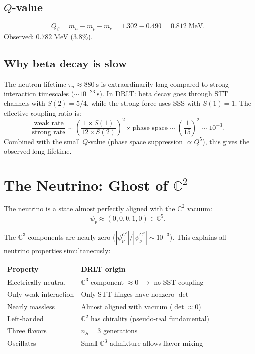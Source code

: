 \documentclass[12pt]{article}
\theoremstyle{remark}
\begin{document}
\subsection{$Q$-value}

\begin{equation}
Q_\beta = m_n - m_p - m_e = 1.302 - 0.490 = 0.812\;\text{MeV}.
\end{equation}
Observed: $0.782\;\text{MeV}$ (3.8\%).

\subsection{Why beta decay is slow}

The neutron lifetime $\tau_n \approx 880\;\text{s}$ is extraordinarily long compared to strong interaction timescales ($\sim 10^{-23}\;\text{s}$). In DRLT: beta decay goes through STT channels with $S(2) = 5/4$, while the strong force uses SSS with $S(1) = 1$. The effective coupling ratio is:
\begin{equation}
\frac{\text{weak rate}}{\text{strong rate}} \sim \left(\frac{1 \times S(1)}{12 \times S(2)}\right)^2 \times \text{phase space} \sim \left(\frac{1}{15}\right)^2 \sim 10^{-3}.
\end{equation}
Combined with the small $Q$-value (phase space suppression $\propto Q^5$), this gives the observed long lifetime.

\section{The Neutrino: Ghost of $\mathbb{C}^2$}

The neutrino is a state almost perfectly aligned with the $\mathbb{C}^2$ vacuum:
\begin{equation}
\psi_\nu \approx (0, 0, 0, 1, 0) \in \mathbb{C}^5.
\end{equation}

The $\mathbb{C}^3$ components are nearly zero ($|\psi_\nu^{C^3}|/|\psi_\nu^{C^2}| \sim 10^{-3}$). This explains all neutrino properties simultaneously:

\begin{center}
\begin{tabular}{ll}
\hline
Property & DRLT origin \\
\hline
Electrically neutral & $\mathbb{C}^3$ component $\approx 0$ $\to$ no SST coupling \\
Only weak interaction & Only STT hinges have nonzero $\det$ \\
Nearly massless & Almost aligned with vacuum ($\det \approx 0$) \\
Left-handed & $\mathbb{C}^2$ has chirality (pseudo-real fundamental) \\
Three flavors & $n_S = 3$ generations \\
Oscillates & Small $\mathbb{C}^3$ admixture allows flavor mixing \\
\hline
\end{tabular}
\end{center}
\end{document}
